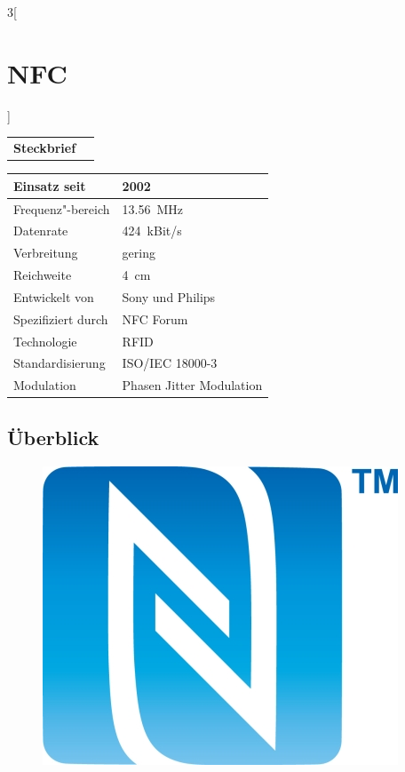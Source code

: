 \begin{multicols}{3}[\section{NFC}]


\newrefsegment

\begin{tabular}{p{}p{2.7 cm}}
\textbf{Steckbrief}& \\
\end{tabular}
\begin{tabular}{p{}p{2.7 cm}}
      Einsatz seit & 2002\\
      \hline
      Frequenz"-bereich  & \SI{13.56}{\mega\hertz}\\
      \hline
      Datenrate & \SI{424}{kBit/s}\\
      \hline
      Verbreitung & gering\\
      \hline
      Reichweite & \SI{4}{cm}\\
      \hline
      Entwickelt von & Sony und Philips \\
      \hline
      Spezifiziert durch & NFC Forum \\
      \hline
      Technologie & RFID \\
      \hline
      Standardisierung & ISO/IEC 18000-3 \\
     \hline
      Modulation & Phasen Jitter Modulation \\
\end{tabular}
\par


\subsection*{Überblick}
\begin{figure} 
\vspace{-20pt} 
\begin{center} 
\hspace{-20pt} 
\includegraphics[width=0.7\linewidth]{Kapitel/NFC/Grafiken/Logo.jpg} 
\end{center} 
\vspace{-15pt} 
\end{figure} 



\end{multicols}
